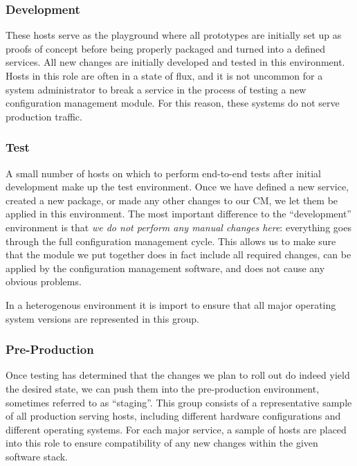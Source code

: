 \subsubsection*{Development}

These hosts serve as the playground where all
prototypes are initially set up as proofs of concept
before being properly packaged and turned into a
defined services.  All new changes are initially
developed and tested in this environment.  Hosts in
this role are often in a state of flux, and it is not
uncommon for a system administrator to break a service
in the process of testing a new configuration
management module.  For this reason, these systems do
not serve production traffic.

\subsubsection*{Test}

A small number of hosts on which to perform end-to-end
tests after initial development make up the test
environment.  Once we have defined a new service,
created a new package, or made any other changes to
our CM, we let them be applied in this environment.
The most important difference to the ``development''
environment is that {\em we do not perform any manual
changes here}: everything goes through the full
configuration management cycle.  This allows us to
make sure that the module we put together does in fact
include all required changes, can be applied by the
configuration management software, and does not cause
any obvious problems.

In a heterogenous environment it is import to ensure that all major
operating system versions are represented in this group.

\subsubsection*{Pre-Production}

Once testing has determined that the changes we plan
to roll out do indeed yield the desired state, we can
push them into the pre-production environment,
sometimes referred to as ``staging''.  This group
consists of a representative sample of all production
serving hosts, including different hardware
configurations and different operating systems.  For
each major service, a sample of hosts are placed into
this role to ensure compatibility of any new changes
within the given software stack.

